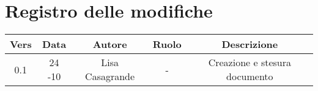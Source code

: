 \section{Registro delle modifiche}

\begin{table}[htbp]
	\begin{tabular}{|c|c|c|c|c|}
		\hline
		\rowcolor[gray]{0.9}
		Vers & Data & Autore & Ruolo & Descrizione \\
		\hline
		0.1 & 24 -10 & Lisa Casagrande & - & Creazione e stesura documento \\
		\hline
	\end{tabular}
\end{table}